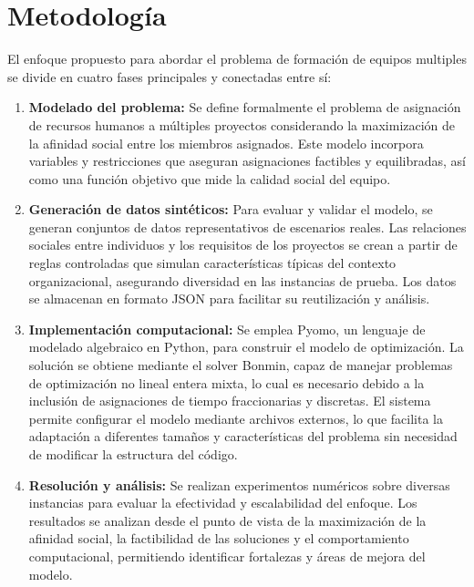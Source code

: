 \documentclass[conference]{IEEEtran}
\begin{document}
\section{Metodología}

El enfoque propuesto para abordar el problema de formación de equipos multiples se divide en cuatro fases principales y conectadas entre sí:

\begin{enumerate}
    \item \textbf{Modelado del problema:} Se define formalmente el problema de asignación de recursos humanos a múltiples proyectos considerando la maximización de la afinidad social entre los miembros asignados. Este modelo incorpora variables y restricciones que aseguran asignaciones factibles y equilibradas, así como una función objetivo que mide la calidad social del equipo.

    \item \textbf{Generación de datos sintéticos:} Para evaluar y validar el modelo, se generan conjuntos de datos representativos de escenarios reales. Las relaciones sociales entre individuos y los requisitos de los proyectos se crean a partir de reglas controladas que simulan características típicas del contexto organizacional, asegurando diversidad en las instancias de prueba. Los datos se almacenan en formato JSON para facilitar su reutilización y análisis.

    \item \textbf{Implementación computacional:} Se emplea Pyomo, un lenguaje de modelado algebraico en Python, para construir el modelo de optimización. La solución se obtiene mediante el solver Bonmin, capaz de manejar problemas de optimización no lineal entera mixta, lo cual es necesario debido a la inclusión de asignaciones de tiempo fraccionarias y discretas. El sistema permite configurar el modelo mediante archivos externos, lo que facilita la adaptación a diferentes tamaños y características del problema sin necesidad de modificar la estructura del código.

    \item \textbf{Resolución y análisis:} Se realizan experimentos numéricos sobre diversas instancias para evaluar la efectividad y escalabilidad del enfoque. Los resultados se analizan desde el punto de vista de la maximización de la afinidad social, la factibilidad de las soluciones y el comportamiento computacional, permitiendo identificar fortalezas y áreas de mejora del modelo.
\end{enumerate}
\end{document}
